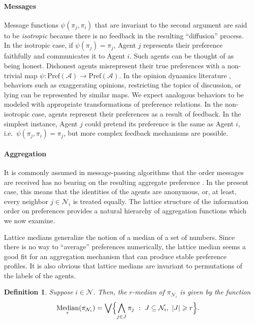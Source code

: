 \documentclass[conference]{ieeeconf}
\newcommand{\N}{\mathcal{N}}
\newcommand{\A}{\mathcal{A}}
\newcommand{\Pref}{\mathrm{Pref}}
\newcommand{\bigjoin}{\bigvee}
\newcommand{\bigmeet}{\bigwedge}
\renewcommand{\geq}{\geqslant}
\DeclareMathOperator{\Median}{Median}
\newtheorem{definition}{Definition}
\begin{document}
\paragraph*{Messages}
Message functions $\psi(\pi_j,\pi_i)$ that are invariant to the second argument are said to be \emph{isotropic} because there is no feedback in the resulting ``diffusion'' process. In the isotropic case, if $\psi(\pi_j) = \pi_j$, Agent $j$ represents their preference faithfully and communicates it to Agent $i$. Such agents can be thought of as being honest. Dishonest agents misrepresent their true preferences with a non-trivial map $\psi: \Pref(\A) \to \Pref(\A)$. In the opinion dynamics literature \cite{hansen2021}, behaviors such as exaggerating opinions, restricting the topics of discussion, or lying can be represented by similar maps. We expect analogous behaviors to be modeled with appropriate transformations of preference relations. In the non-isotropic case, agents represent their preferences as a result of feedback. In the simplest instance, Agent $j$ could pretend its preference is the same as Agent $i$, i.e.~$\psi(\pi_j,\pi_i) = \pi_j$, but more complex feedback mechanisms are possible.

\paragraph*{Aggregation}
It is commonly assumed in message-passing algorithms that the order messages are received has no bearing on the resulting aggregate preference \cite{?}. In the present case, this means that the identities of the agents are anonymous, or, at least, every neighbor $j \in \N_i$ is treated equally. The lattice structure of the information order on preferences provides a natural hierarchy of aggregation functions which we now examine.

Lattice medians generalize the notion of a median of a set of numbers. Since there is no way to ``average'' preferences numerically, the lattice median seems a good fit for an aggregation mechanism that can produce stable preference profiles. It is also obvious that lattice medians are invariant to permutations of the labels of the agents.
\begin{definition}
    Suppose $i \in \N$. Then, the $r$-\emph{median} of  $\pi_{\N_i}$ is given by the function
\begin{align}
    \Median_r(\pi_{\N_i}) = \bigjoin \Bigl\{ \bigmeet_{j \in J} \pi_j~:~J \subseteq \N_i,~|J| \geq r \Bigr\}.
\end{align}
\end{definition}
\end{document}
